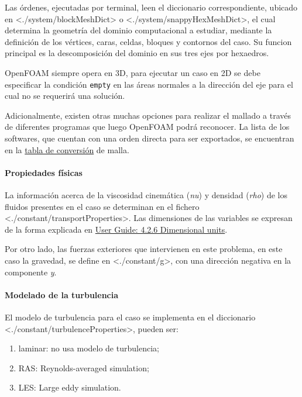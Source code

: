 Las órdenes, ejecutadas por terminal, leen el diccionario
correspondiente, ubicado en
\textless{}./system/blockMeshDict\textgreater{} o
\textless{}./system/snappyHexMeshDict\textgreater{}, el cual determina
la geometría del dominio computacional a estudiar, mediante la
definición de los vértices, caras, celdas, bloques y contornos del caso.
Su funcion principal es la descomposición del dominio en sus tres ejes
por hexaedros.

OpenFOAM siempre opera en 3D, para ejecutar un caso en 2D se debe
especificar la condición \texttt{empty} en las áreas normales a la
dirección del eje para el cual no se requerirá una solución.

Adicionalmente, existen otras muchas opciones para realizar el mallado a
través de diferentes programas que luego OpenFOAM podrá reconocer. La
lista de los softwares, que cuentan con una orden directa para ser
exportados, se encuentran en la
\href{http://www.openfoam.org/features/mesh-conversion.php}{tabla de
conversión} de malla.

\paragraph{Propiedades físicas}\label{header-n137}

La información acerca de la viscosidad cinemática (\emph{nu}) y densidad
(\emph{rho}) de los fluidos presentes en el caso se determinan en el
fichero \textless{}./constant/transportProperties\textgreater{}. Las
dimensiones de las variables se expresan de la forma explicada en
\href{https://cfd.direct/openfoam/user-guide/basic-file-format/\#x17-1290004.2.6}{User
Guide: 4.2.6 Dimensional units}.

Por otro lado, las fuerzas exteriores que intervienen en este problema,
en este caso la gravedad, se define en
\textless{}./constant/g\textgreater{}, con una dirección negativa en la
componente \emph{y}.

\paragraph{Modelado de la turbulencia}\label{header-n144}

El modelo de turbulencia para el caso se implementa en el diccionario
\textless{}./constant/turbulenceProperties\textgreater{}, pueden ser:

\begin{enumerate}
\def\labelenumi{\arabic{enumi}.}
\item
  laminar: no usa modelo de turbulencia;
\item
  RAS: Reynolds-averaged simulation;
\item
  LES: Large eddy simulation.
\end{enumerate}

